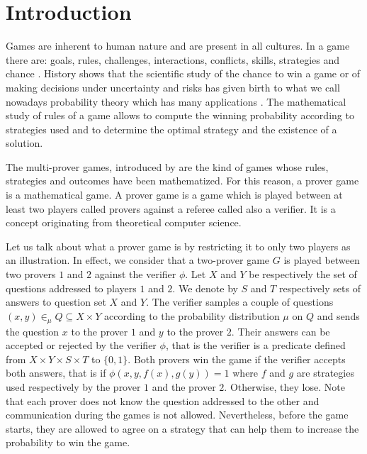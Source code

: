 \chapter{Introduction}

Games are inherent to  human nature and are present in all cultures.  In a game there are: goals, rules, challenges, interactions, conflicts, skills, strategies and chance \citep{mcgonigal2011reality, crawford1984art}.
History shows
that the scientific study of the chance to win a game or of making decisions under uncertainty and risks has given birth to what we call nowadays probability theory which has many applications
\citep{freund2012introduction}. The mathematical study of rules of a game allows to compute the winning probability according to strategies used and to determine the optimal strategy and the existence of a solution.

The multi-prover games, 
introduced by \cite*{ben1988multi} are the kind 
of  games whose rules, strategies and outcomes  have been mathematized. For this reason, a prover game is a mathematical game. A prover game is a game which is played between at least two players called provers against a referee called also a verifier. It is a concept originating from theoretical computer science.  

Let us talk about what a prover game is by restricting it to only two players as an illustration.  In effect, we consider that a two-prover game $G$ is played between two provers $1$ and $2$ against the verifier $\phi$.   Let $X$ and $Y$ be respectively the set of questions addressed to players $1$ and $2.$ We denote by $S$ and $T$ respectively  sets of answers to question set $X$ and $Y$. The verifier samples a couple of questions $(x,y) \in_{\mu} Q \subseteq X \times Y$ according to the  probability distribution $\mu$ on $Q$ and sends the question $x$ to the prover $1$ and $y$ to the prover $2.$ Their answers can be accepted or rejected by the verifier $\phi$, that is the verifier is a predicate defined from $X \times Y \times S \times T$ to $\{0,1\}.$ Both  provers win the game if the verifier accepts both answers, that is if $\phi (x,y,f(x),g(y))=1$ where $f$ and $g$ are  strategies used respectively by the prover $1$ and the prover $2.$ Otherwise, they lose.
Note that each prover does not know the question addressed to the other and communication during the games is not allowed. Nevertheless, before the game starts, they are allowed to agree on a strategy that can help them to increase the probability to win  the game.

